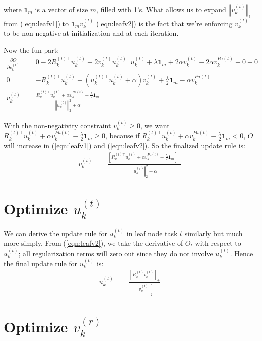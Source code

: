 \documentclass{article}
\begin{document}
where $\boldsymbol{1}_m$ is a vector of size $m$, filled with 1's. What allows us to expand $ \left\Vert v_k^{(t)} \right\Vert_1$ from (\ref{eqn:leafv1}) to $\boldsymbol{1}_m^\top  v_k^{(t)}$ (\ref{eqn:leafv2}) is the fact that we're enforcing $ v_k^{(t)}$ to be non-negative at initialization and at each iteration.
\medskip

Now the fun part:
\begin{align}
\frac{\partial O}{\partial v^{(t)}_{k}} &=
0 - 2R^{(t)\top}_ku^{(t)}_{k} + 2  v^{(t)}_{k} u^{(t)\top}_{k} u^{(t)}_{k}
+ \lambda \boldsymbol{1}_m
+ 2 \alpha v^{(t)}_{k}
- 2 \alpha v^{Pa(t)}_{k} + 0 + 0 \\
0 &= -R^{(t)\top}_ku^{(t)}_{k} 
+ \left(u^{(t)\top}_{k} u^{(t)}_{k} + \alpha  \right) v^{(t)}_{k}
+ \frac{\lambda}{2} \boldsymbol{1}_m
- \alpha v^{Pa(t)}_{k} \\
v^{(t)}_{k}&= \frac{R^{(t)\top}_ku^{(t)}_{k} + \alpha v^{Pa(t)}_{k}-\frac{\lambda}{2} \boldsymbol{1}_m}{\left\Vert u^{(t)}_{k} \right\Vert_2^2 + \alpha}
\end{align}

With the non-negativity constraint $v^{(t)}_{k} \geq 0$, we want $R^{(t)\top}_ku^{(t)}_{k} + \alpha v^{Pa(t)}_{k} - \frac{\lambda}{2} \boldsymbol{1}_m\geq 0$, because if $R^{(t)\top}_ku^{(t)}_{k} + \alpha v^{Pa(t)}_{k} - \frac{\lambda}{2} \boldsymbol{1}_m < 0$, $O$ will increase in (\ref{eqn:leafv1}) and (\ref{eqn:leafv2}). So the finalized update rule is:
\begin{align}
v^{(t)}_{k}&= \frac{\left[ R^{(t)\top}_ku^{(t)}_{k} + \alpha v^{Pa(t)}_{k}  - \frac{\lambda}{2} \boldsymbol{1}_m\right]_+ }
{\left\Vert u^{(t)}_{k} \right\Vert_2^2 + \alpha }
\end{align}

\section*{Optimize $u^{(t)}_{k}$}
We can derive the update rule for $u^{(t)}_{k}$ in leaf node task $t$ similarly but much more simply.  From (\ref{eqn:leafv2}), we take the derivative of $O_t$ with respect to $u^{(t)}_{k}$; all regularization terms will zero out since they do not involve $u^{(t)}_{k}$. Hence the final update rule for $u^{(t)}_{k}$ is:
\begin{align}
u^{(t)}_{k}&= \frac{\left[ R^{(t)}_kv^{(t)}_{k} \right]_+ }{\left\Vert v^{(t)}_{k} \right\Vert_2^2 }
\end{align}

\section*{Optimize $v^{(r)}_{k}$}
\end{document}
